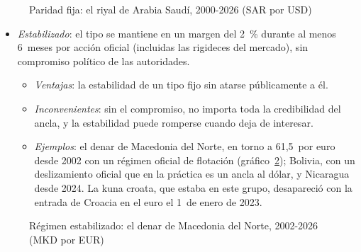 \documentclass[11pt]{article}
\begin{document}
\begin{figure}[H]
\centering
\caption{Paridad fija: el riyal de Arabia Saudí, 2000-2026 (SAR por USD)}\label{fig:riyal}
\end{figure}

\begin{itemize}
\item \emph{Estabilizado}: el tipo se mantiene en un margen del 2~\% durante al menos 6~meses por acción oficial (incluidas las rigideces del mercado), sin compromiso político de las autoridades.
  \begin{itemize}
  \item \emph{Ventajas}: la estabilidad de un tipo fijo sin atarse públicamente a él.
  \item \emph{Inconvenientes}: sin el compromiso, no importa toda la credibilidad del ancla, y la estabilidad puede romperse cuando deja de interesar.
  \item \emph{Ejemplos}: el denar de Macedonia del Norte, en torno a 61,5~por euro desde 2002 con un régimen oficial de flotación (gráfico~\ref{fig:denar}); Bolivia, con un deslizamiento oficial que en la práctica es un ancla al dólar, y Nicaragua desde 2024. La kuna croata, que estaba en este grupo, desapareció con la entrada de Croacia en el euro el 1~de enero de 2023\nocite{FMI2024AREAER2023}.
  \end{itemize}
\end{itemize}

\begin{figure}[H]
\centering
\caption{Régimen estabilizado: el denar de Macedonia del Norte, 2002-2026 (MKD por EUR)}\label{fig:denar}
\end{figure}
\end{document}
